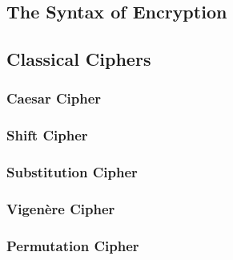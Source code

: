 \subsection{The Syntax of Encryption}

\subsection{Classical Ciphers}

\subsubsection{Caesar Cipher}

\subsubsection{Shift Cipher}

\subsubsection{Substitution Cipher}

\subsubsection{Vigenère Cipher}

\subsubsection{Permutation Cipher}
